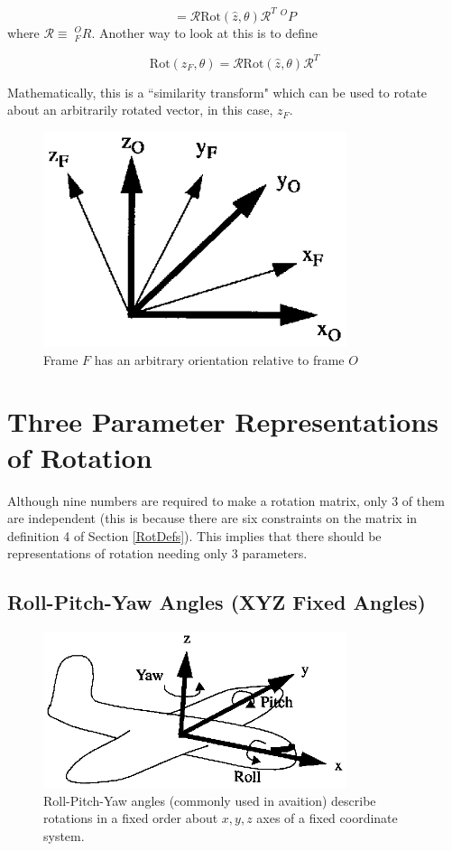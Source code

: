 \[
= \mathcal{R} \mathrm{Rot}(\hat{z},\theta)\mathcal{R}^T \; ^OP
\]
where $\mathcal{R} \equiv \;{}^O_FR$.
Another way to look at this is to define

\[
\mathrm{Rot}(z_F,\theta) = \mathcal{R} \mathrm{Rot}(\hat{z},\theta)\mathcal{R}^T
\]

Mathematically, this is a ``similarity transform" which can be used to rotate about an arbitrarily rotated vector, in this case, $z_F$.




\begin{figure}
\includegraphics[width=3.5in]{figs02/00326.eps}
\caption{Frame $F$ has an arbitrary orientation relative to frame $O$}\label{ArbitraryRotation}
\end{figure}






\section{Three Parameter Representations of Rotation}
Although nine numbers are required to make a rotation matrix, only 3 of them are independent (this is because there are six constraints on the matrix in definition 4 of Section \ref{RotDefs}).  This implies that there should be representations of rotation needing only 3 parameters.


\subsection{Roll-Pitch-Yaw Angles (XYZ Fixed Angles)}

\begin{figure}
\includegraphics[width=3.5in]{figs02/00327.eps}
\caption{Roll-Pitch-Yaw angles (commonly used in avaition) describe rotations in a fixed order about $x,y,z$ axes of a fixed coordinate system.}\label{RollPitchYawFig}
\end{figure}

